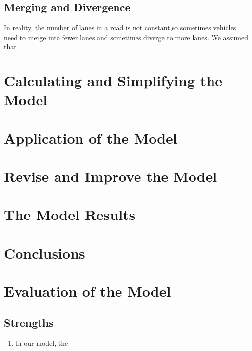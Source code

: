 \documentclass{icmmcm}
\begin{document}
\subsection{Merging and Divergence}
In reality, the number of lanes in a road is not constant,so sometimes vehicles need to merge into fewer lanes and sometimes diverge to more lanes. We assumed that
\section{Calculating and Simplifying the Model}
\section{Application of the Model}%
\section{Revise and Improve the Model}
\section{The Model Results}
\subsection{}
\section{Conclusions}
\section{Evaluation of the Model}
\subsection{Strengths}
\begin{enumerate}
\item In our model, the
\end{enumerate}
\end{document}
